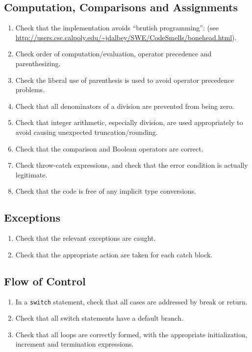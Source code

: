 \documentclass[a4paper,11pt]{report} %
\begin{document}
		\subsection*{Computation, Comparisons and Assignments}\begin{enumerate}[resume]
			\item Check that the implementation avoids ``brutish programming'': (see \url{http://users.csc.calpoly.edu/~jdalbey/SWE/CodeSmells/bonehead.html}). 
			\item Check order of computation/evaluation, operator precedence and parenthesizing.
			\item Check the liberal use of parenthesis is used to avoid operator precedence problems.
			\item Check that all denominators of a division are prevented from being zero.
			\item Check that integer arithmetic, especially division, are used appropriately to avoid causing unexpected truncation/rounding.
			\item Check that the comparison and Boolean operators are correct.
			\item Check throw-catch expressions, and check that the error condition is actually legitimate.
			\item Check that the code is free of any implicit type conversions.
		\end{enumerate}
		
		\subsection*{Exceptions}\begin{enumerate}[resume]
			\item Check that the relevant exceptions are caught.
			\item Check that the appropriate action are taken for each catch block.
		\end{enumerate}
		
		\subsection*{Flow of Control}\begin{enumerate}[resume]
			\item In a \texttt{switch} statement, check that all cases are addressed by break or return.
			\item Check that all switch statements have a default branch.
			\item Check that all loops are correctly formed, with the appropriate initialization, increment and termination expressions.
		\end{enumerate}
		
\end{document}
